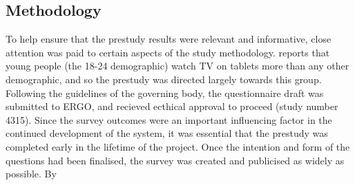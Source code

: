 
\subsection{Methodology}




To help ensure that the prestudy results were relevant and informative, close attention was paid to certain aspects of the study methodology.
\citet{viacom} reports that young people (the 18-24 demographic) watch TV on tablets more than any other demographic, and so the prestudy was directed largely towards this group. %
Following the guidelines of the governing body, the questionnaire draft was submitted to ERGO, and recieved ecthical approval to proceed (study number 4315).
Since the survey outcomes were an important influencing factor in the continued development of the system, it was essential that the prestudy was completed early in the lifetime of the project. Once the intention and form of the questions had been finalised, the survey was created and publicised as widely as possible.
By 

